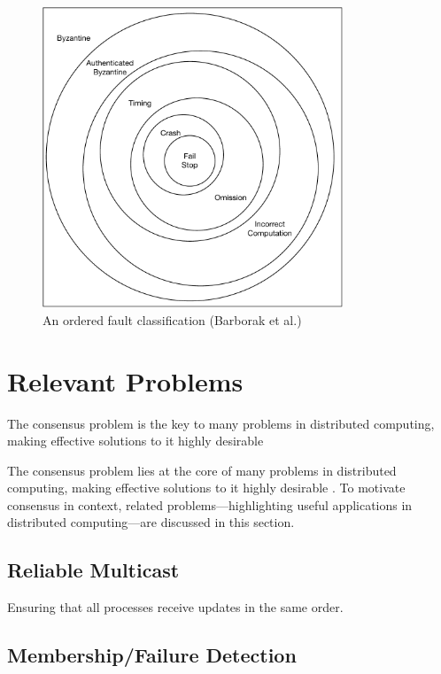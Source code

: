 \documentclass[12pt, a4paper]{article}
\begin{document}
\begin{figure}[htp]
  \centering
  \includegraphics[width=0.8\textwidth]{img/AOFC.pdf}
  \caption{An ordered fault classification (Barborak et al.)}
  \label{fig:aofc}
\end{figure}


\section{Relevant Problems} \label{sec:relevant-problems}

The consensus problem is the key to many problems in distributed computing, 
making effective solutions to it highly desirable
\cite{fritzke2001consensus}

The consensus problem lies at the core of many problems in distributed
computing, making effective solutions to it highly desirable
\cite{fischer1985impossibility}. To motivate consensus in context, related
problems---highlighting useful applications in distributed computing---are
discussed in this section.

\subsection{Reliable Multicast}

Ensuring that all processes receive updates in the same order.

\subsection{Membership/Failure Detection}
\end{document}
